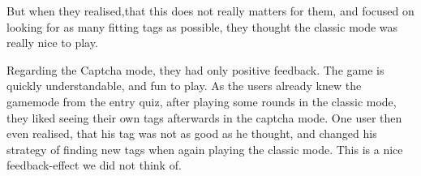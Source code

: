 But when they realised,that this does not really matters for them, and focused on looking for as many fitting tags as possible, they thought the classic mode was really nice to play.

Regarding the Captcha mode, they had only positive feedback. The game is quickly understandable, and fun to play.
As the users already knew the gamemode from the entry quiz, after playing some rounds in the classic mode, they liked seeing their own tags afterwards in the captcha mode.
One user then even realised, that his tag was not as good as he thought, and changed his strategy of finding new tags when again playing the classic mode.
This is a nice feedback-effect we did not think of.